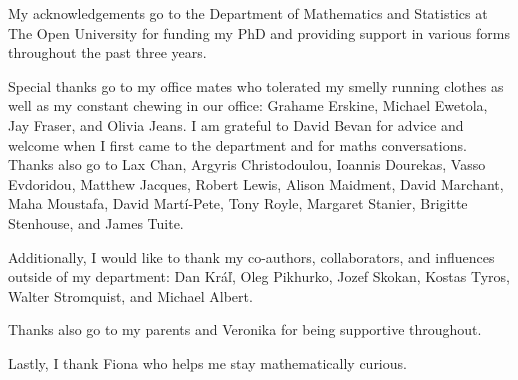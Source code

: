 \documentclass[12pt, a4paper, twoside]{report}
\begin{document}
My acknowledgements go to the Department of Mathematics and Statistics at The Open University for funding my PhD and providing support in various forms throughout the past three years.

Special thanks go to my office mates who tolerated my smelly running clothes as well as my constant chewing in our office: Grahame Erskine, Michael Ewetola, Jay Fraser, and Olivia Jeans. I am grateful to David Bevan for advice and welcome when I first came to the department and for maths conversations. Thanks also go to Lax Chan, Argyris Christodoulou, Ioannis Dourekas, Vasso Evdoridou, Matthew Jacques, Robert Lewis, Alison Maidment, David Marchant, Maha Moustafa, David Mart\'{i}-Pete, Tony Royle, Margaret Stanier, Brigitte Stenhouse, and James Tuite.

Additionally, I would like to thank my co-authors, collaborators, and influences outside of my department: Dan Kr\'a\v{l}, Oleg Pikhurko, Jozef Skokan, Kostas Tyros, Walter Stromquist, and Michael Albert.

Thanks also go to my parents and Veronika for being supportive throughout.

Lastly, I thank Fiona who helps me stay mathematically curious.
\afterpage{\null\newpage}
\end{document}
